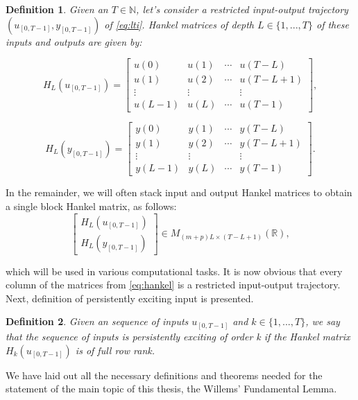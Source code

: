 \documentclass[12pt,a4paper]{report}
\newtheorem{definition}{Definition}
\begin{document}
\begin{definition}
    Given an $T \in \mathbb{N}$, let's consider a restricted input-output trajectory \((u_{[0, T-1]},\allowbreak y_{[0, T-1]})\) of \eqref{eq:lti}. Hankel matrices
    of depth $L \in \{1, ..., T\}$ of these inputs and outputs are given by:

    \[H_{L}(u_{[0, T-1]}) =
    \begin{bmatrix}
    u(0) & u(1) & \cdots & u(T-L) \\
    u(1) & u(2) & \cdots & u(T-L+1)\\
    \vdots & \vdots &  & \vdots \\
    u(L-1) & u(L) & \cdots & u(T-1)
    \end{bmatrix},\]

    \[H_{L}(y_{[0, T-1]}) =
    \begin{bmatrix}
    y(0) & y(1) & \cdots & y(T-L) \\
    y(1) & y(2) & \cdots & y(T-L+1)\\
    \vdots & \vdots &  & \vdots \\
    y(L-1) & y(L) & \cdots & y(T-1)
    \end{bmatrix}.\]

    \label{def:hankel}
\end{definition}

In the remainder, we will often stack input and output Hankel matrices to obtain a single block Hankel matrix, as follows:
\begin{equation}
    \begin{bmatrix} H_{L}(u_{[0, T-1]}) \\ H_{L}(y_{[0, T-1]}) \end{bmatrix} \in M_{(m+p)L \times (T-L+1)}(\mathbb{R}),
    \label{eq:hankel}
\end{equation}

which will be used in various computational tasks.
It is now obvious that every column of the matrices from \eqref{eq:hankel} is a restricted input-output trajectory.
Next, definition of persistently exciting input is presented.

\begin{definition}
    Given an sequence of inputs $u_{[0, T-1]}$ and \(k \in \{1, ..., T\}\), we say that
    the sequence of inputs is persistently exciting of order k if the Hankel matrix
    $H_{k}(u_{[0, T-1]})$ is of full row rank.
\end{definition}

We have laid out all the necessary definitions and theorems needed for the statement of the main topic of this
thesis, the Willems' Fundamental Lemma.
\end{document}
